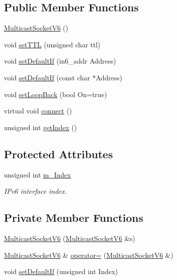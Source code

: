 \subsection*{Public Member Functions}
\begin{DoxyCompactItemize}
\item 
\hyperlink{classMulticastSocketV6_ad99bb6fa0274bc92f4a342c004b395a2}{Multicast\+Socket\+V6} ()
\item 
void \hyperlink{classMulticastSocketV6_af33892d079526e17dfe7cac4128bc0d1}{set\+T\+TL} (unsigned char ttl)
\item 
void \hyperlink{classMulticastSocketV6_a79e2bd2544a73c01cc7e8c8b998da4e1}{set\+Default\+If} (in6\+\_\+addr Address)
\item 
void \hyperlink{classMulticastSocketV6_ad7534d71b628f9be4af98161cd35bdf9}{set\+Default\+If} (const char $\ast$Address)
\item 
void \hyperlink{classMulticastSocketV6_a04dea92292a94e6f395de06edf063711}{set\+Loop\+Back} (bool On=true)
\item 
virtual void \hyperlink{classMulticastSocketV6_a81b62a13aff687c5b94b8f8a946c58ed}{connect} ()
\item 
unsigned int \hyperlink{classMulticastSocketV6_a6f8366a51c3bb4c9403ec29f84432db0}{get\+Index} ()
\end{DoxyCompactItemize}
\subsection*{Protected Attributes}
\begin{DoxyCompactItemize}
\item 
unsigned int \hyperlink{classMulticastSocketV6_a97955011956119b7e551c3070f521f93}{m\+\_\+\+Index}
\begin{DoxyCompactList}\small\item\em I\+Pv6 interface index. \end{DoxyCompactList}\end{DoxyCompactItemize}
\subsection*{Private Member Functions}
\begin{DoxyCompactItemize}
\item 
\hyperlink{classMulticastSocketV6_a2a28ad5ec5326ce88700f6518eba6699}{Multicast\+Socket\+V6} (\hyperlink{classMulticastSocketV6}{Multicast\+Socket\+V6} \&s)
\item 
\hyperlink{classMulticastSocketV6}{Multicast\+Socket\+V6} \& \hyperlink{classMulticastSocketV6_a12383da396c4492f43fc9c0dfeb511b6}{operator=} (\hyperlink{classMulticastSocketV6}{Multicast\+Socket\+V6} \&)
\item 
void \hyperlink{classMulticastSocketV6_a4e211b18653d1a8ce29651068293960b}{set\+Default\+If} (unsigned int Index)
\end{DoxyCompactItemize}
